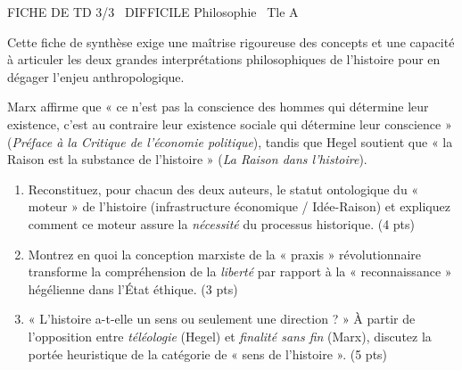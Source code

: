 \documentclass[11pt]{article}
\begin{document}
\begin{tcolorbox}[enhanced,colback=popink,colframe=popink,arc=10pt,boxrule=0pt,left=12pt,right=12pt,top=9pt,bottom=9pt]
{\color{white}\popxbold\small FICHE DE TD 3/3 \textbullet\ DIFFICILE \hfill Philosophie \textbullet\ Tle A\par}
\end{tcolorbox}
\vspace{4pt}
Cette fiche de synthèse exige une maîtrise rigoureuse des concepts et une capacité à articuler les deux grandes interprétations philosophiques de l'histoire pour en dégager l'enjeu anthropologique.

\begin{exercice}
Marx affirme que « ce n'est pas la conscience des hommes qui détermine leur existence, c'est au contraire leur existence sociale qui détermine leur conscience » (\textit{Préface à la Critique de l'économie politique}), tandis que Hegel soutient que « la Raison est la substance de l'histoire » (\textit{La Raison dans l'histoire}).
\begin{enumerate}
    \item Reconstituez, pour chacun des deux auteurs, le statut ontologique du « moteur » de l'histoire (infrastructure économique / Idée-Raison) et expliquez comment ce moteur assure la \textit{nécessité} du processus historique. (4 pts)
    \item Montrez en quoi la conception marxiste de la « praxis » révolutionnaire transforme la compréhension de la \textit{liberté} par rapport à la « reconnaissance » hégélienne dans l'État éthique. (3 pts)
    \item « L'histoire a-t-elle un sens ou seulement une direction ? » À partir de l'opposition entre \textit{téléologie} (Hegel) et \textit{finalité sans fin} (Marx), discutez la portée heuristique de la catégorie de « sens de l'histoire ». (5 pts)
\end{enumerate}
\end{exercice}
\end{document}
